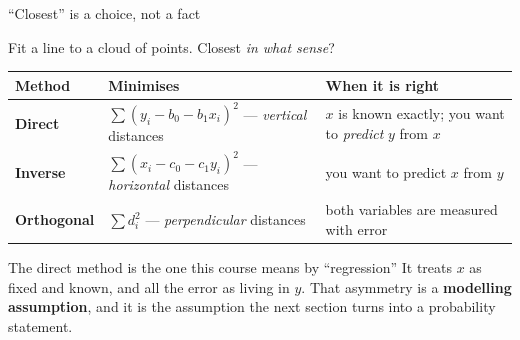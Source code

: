 \documentclass[aspectratio=169]{beamer}
\begin{document}
\begin{frame}[shrink=6]{``Closest'' is a choice, not a fact}
  \begin{center}
    Fit a line to a cloud of points. Closest \emph{in what sense}?
  \end{center}
  \vspace{0.2em}
  \begin{center}\small
  \begin{tabular}{@{}lp{4.6cm}p{4.2cm}@{}}
    \toprule
    \textbf{Method} & \textbf{Minimises} & \textbf{When it is right}\\
    \midrule
    \textbf{Direct} & $\sum (y_i - b_0 - b_1x_i)^2$ ---
      \emph{vertical} distances & $x$ is known exactly; you want to
      \emph{predict} $y$ from $x$\\[4pt]
    \textbf{Inverse} & $\sum (x_i - c_0 - c_1y_i)^2$ ---
      \emph{horizontal} distances & you want to predict $x$ from $y$\\[4pt]
    \textbf{Orthogonal} & $\sum d_i^2$ --- \emph{perpendicular} distances &
      both variables are measured with error\\
    \bottomrule
  \end{tabular}
  \end{center}
  \vspace{0.3em}
  \begin{block}{The direct method is the one this course means by ``regression''}
    \small It treats $x$ as fixed and known, and all the error as living in
    $y$. That asymmetry is a \textbf{modelling assumption}, and it is the
    assumption the next section turns into a probability statement.
  \end{block}
\end{frame}
\end{document}
